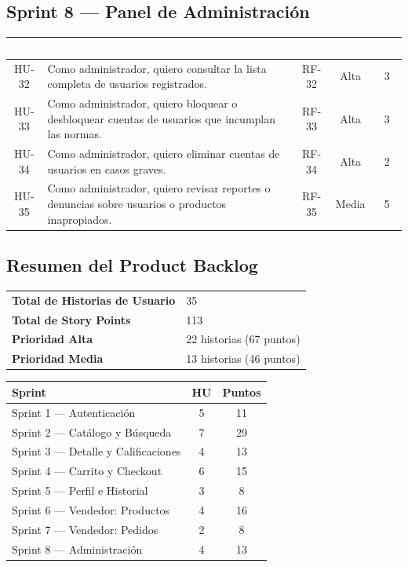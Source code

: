 \documentclass[12pt,a4paper]{article}
\begin{document}
\subsection{Sprint 8 --- Panel de Administración}
\begin{longtable}{|c|p{8cm}|c|c|c|}
\hline
\rowcolor{darkbg}\textcolor{white}{\textbf{ID}} & \textcolor{white}{\textbf{Historia de Usuario}} & \textcolor{white}{\textbf{RF}} & \textcolor{white}{\textbf{Prior.}} & \textcolor{white}{\textbf{Pts}} \\
\hline
HU-32 & Como administrador, quiero consultar la lista completa de usuarios registrados. & RF-32 & Alta & 3 \\
\hline
HU-33 & Como administrador, quiero bloquear o desbloquear cuentas de usuarios que incumplan las normas. & RF-33 & Alta & 3 \\
\hline
HU-34 & Como administrador, quiero eliminar cuentas de usuarios en casos graves. & RF-34 & Alta & 2 \\
\hline
HU-35 & Como administrador, quiero revisar reportes o denuncias sobre usuarios o productos inapropiados. & RF-35 & Media & 5 \\
\hline
\end{longtable}

\subsection{Resumen del Product Backlog}

\begin{center}
\begin{tabular}{ll}
\toprule
\textbf{Total de Historias de Usuario} & 35 \\
\textbf{Total de Story Points} & 113 \\
\midrule
\textbf{Prioridad Alta} & 22 historias (67 puntos) \\
\textbf{Prioridad Media} & 13 historias (46 puntos) \\
\bottomrule
\end{tabular}
\end{center}

\begin{center}
\begin{tabular}{lcc}
\toprule
\textbf{Sprint} & \textbf{HU} & \textbf{Puntos} \\
\midrule
Sprint 1 --- Autenticación & 5 & 11 \\
Sprint 2 --- Catálogo y Búsqueda & 7 & 29 \\
Sprint 3 --- Detalle y Calificaciones & 4 & 13 \\
Sprint 4 --- Carrito y Checkout & 6 & 15 \\
Sprint 5 --- Perfil e Historial & 3 & 8 \\
Sprint 6 --- Vendedor: Productos & 4 & 16 \\
Sprint 7 --- Vendedor: Pedidos & 2 & 8 \\
Sprint 8 --- Administración & 4 & 13 \\
\bottomrule
\end{tabular}
\end{center}
\end{document}
